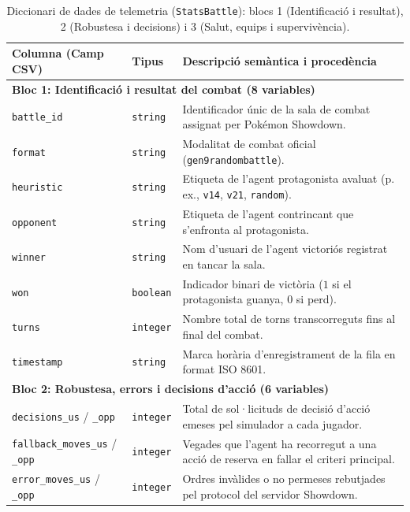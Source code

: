 \begin{table}[htbp]
\centering
\caption{Diccionari de dades de telemetria (\texttt{StatsBattle}): blocs 1 (Identificació i resultat), 2 (Robustesa i decisions) i 3 (Salut, equips i supervivència).}
\label{tab:app_telemetry_part1}
\footnotesize
\renewcommand{\arraystretch}{1.12}
\begin{tabularx}{\textwidth}{lp{1.8cm}>{\raggedright\arraybackslash}X}
\toprule
\textbf{Columna (Camp CSV)} & \textbf{Tipus} & \textbf{Descripció semàntica i procedència} \\
\midrule
\multicolumn{3}{l}{\textbf{Bloc 1: Identificació i resultat del combat (8 variables)}} \\
\midrule
\texttt{battle\_id} & \texttt{string} & Identificador únic de la sala de combat assignat per Pokémon Showdown. \\
\texttt{format} & \texttt{string} & Modalitat de combat oficial (\texttt{gen9randombattle}). \\
\texttt{heuristic} & \texttt{string} & Etiqueta de l'agent protagonista avaluat (p. ex., \texttt{v14}, \texttt{v21}, \texttt{random}). \\
\texttt{opponent} & \texttt{string} & Etiqueta de l'agent contrincant que s'enfronta al protagonista. \\
\texttt{winner} & \texttt{string} & Nom d'usuari de l'agent victoriós registrat en tancar la sala. \\
\texttt{won} & \texttt{boolean} & Indicador binari de victòria ($1$ si el protagonista guanya, $0$ si perd). \\
\texttt{turns} & \texttt{integer} & Nombre total de torns transcorreguts fins al final del combat. \\
\texttt{timestamp} & \texttt{string} & Marca horària d'enregistrament de la fila en format ISO 8601. \\
\midrule
\multicolumn{3}{l}{\textbf{Bloc 2: Robustesa, errors i decisions d'acció (6 variables)}} \\
\midrule
\texttt{decisions\_us} / \texttt{\_opp} & \texttt{integer} & Total de sol·licituds de decisió d'acció emeses pel simulador a cada jugador. \\
\texttt{fallback\_moves\_us} / \texttt{\_opp} & \texttt{integer} & Vegades que l'agent ha recorregut a una acció de reserva en fallar el criteri principal. \\
\texttt{error\_moves\_us} / \texttt{\_opp} & \texttt{integer} & Ordres invàlides o no permeses rebutjades pel protocol del servidor Showdown. \\

\end{tabularx}
\end{table}

